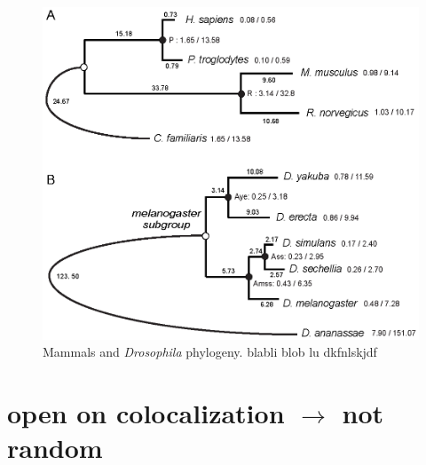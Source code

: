\begin{figure}[htpb] 
\centering 
\includegraphics[width=\textwidth]{figures/gssa/phylogenies.png}
\caption[Mammals and \textit{Drosophila} phylogeny]{Mammals and
  \textit{Drosophila} phylogeny. blabli blob lu dkfnlskjdf}
\label{fig:phylogeny}
\end{figure}


\section{open on colocalization $\rightarrow$ not random}

